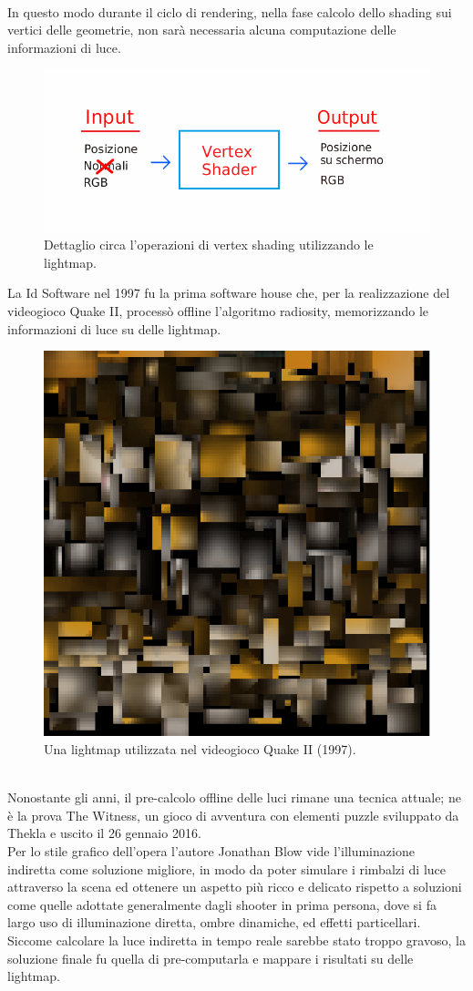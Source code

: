 \\
In questo modo durante il ciclo di rendering, nella fase calcolo dello shading sui vertici delle geometrie, non sarà necessaria alcuna computazione delle informazioni di luce.
\newpage 
\begin{figure}[htb]
 \centering
 \includegraphics[width=0.8\linewidth]{images/chapter_stato_arte/stato_arte_ver_sh.jpg}\hfill
 \caption[Vertex shading lightmap]{Dettaglio circa l'operazioni di vertex shading utilizzando le lightmap.}
 \label{fig:stato_arte_ver_sh}
\end{figure}
La Id Software nel 1997 fu la prima software house che, per la realizzazione del videogioco Quake II, processò offline l’algoritmo radiosity, memorizzando le informazioni di luce su delle lightmap. \cite{light7}
\\
\begin{figure}[htb]
 \centering
 \includegraphics[width=0.4\linewidth]{images/chapter_stato_arte/stato_arte_quake_lightmap.png}\hfill
 \caption[Lightmap Quake II]{Una lightmap utilizzata nel videogioco Quake II (1997).}
 \label{fig:stato_arte_quake_lightmap}
\end{figure}
\\
Nonostante gli anni, il pre-calcolo offline delle luci rimane una tecnica attuale; ne è la prova The Witness, un gioco di avventura con elementi puzzle sviluppato da Thekla e uscito il 26 gennaio 2016. \cite{light3,light4,light8}
\\
Per lo stile grafico dell’opera l’autore Jonathan Blow vide l’illuminazione indiretta come soluzione migliore, in modo da poter simulare i rimbalzi di luce attraverso la scena ed ottenere un aspetto più ricco e delicato rispetto a soluzioni come quelle adottate generalmente dagli shooter in prima persona, dove si fa largo uso di illuminazione diretta, ombre dinamiche, ed effetti particellari. Siccome calcolare la luce indiretta in tempo reale sarebbe stato troppo gravoso, la soluzione finale fu quella di pre-computarla e mappare i risultati su delle   lightmap.	
